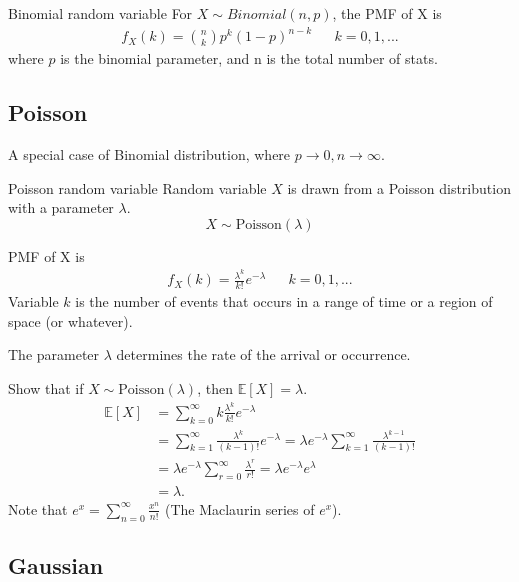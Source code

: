 \begin{fact}{Binomial random variable}{}
  For $X \sim Binomial(n,p)$, the PMF of X is
  \begin{align*}
    f_X(k) = \binom{n}{k}p^k(1-p)^{n-k} &&k=0,1,...
  \end{align*}
  where $p$ is the binomial parameter, and n is the total number of stats.
\end{fact}

\subsection{Poisson}
A special case of Binomial distribution, where $p\rightarrow0,n\rightarrow\infty$.

\begin{fact}{Poisson random variable}{}
  Random variable $X$ is drawn from a Poisson distribution with a parameter $\lambda$.
  \begin{equation*}
      X \sim \text{Poisson}(\lambda)
  \end{equation*}

  PMF of X is
  \begin{align*}
    f_X(k) =  \frac{\lambda^k}{k!}e^{-\lambda} && k = 0,1,...
  \end{align*}
  Variable $k$ is the number of events that occurs in a range of time or a region of space (or whatever).

  The parameter $\lambda$ determines the rate of the arrival or occurrence.
\end{fact}

\begin{exec}
  Show that if $X\sim \text{Poisson}(\lambda)$, then $\mathbb{E}[X]=\lambda$.
  \tcblower
  \begin{align*}
    \mathbb{E}[X]
    &= \sum_{k=0}^{\infty} k\frac{\lambda^k}{k!}e^{-\lambda}\\
    &= \sum_{k=1}^{\infty}\frac{\lambda^k}{(k-1)!}e^{-\lambda} = \lambda e^{-\lambda}\sum_{k=1}^{\infty}\frac{\lambda^{k-1}}{(k-1)!}\\
    &= \lambda e^{-\lambda}\sum_{r=0}^{\infty}\frac{\lambda^{r}}{r!} = \lambda e^{-\lambda}e^{\lambda}\\
    &= \lambda.
  \end{align*}
  Note that $e^x=\sum_{n=0}^{\infty}\frac{x^n}{n!}$ (The Maclaurin series of $e^x$).
\end{exec}

\subsection{Gaussian}

